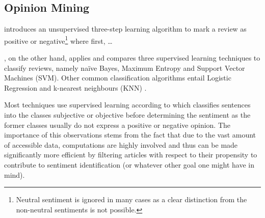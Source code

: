 
\subsection{Opinion Mining}

\textcite{Turney.2002} introduces an unsupervised three-step learning algorithm to mark a review as positive or negative\footnote{Neutral sentiment is ignored in many cases as a clear distinction from the non-neutral sentiments is not possible.} where first, \dots


\textcite{Pang.2002}, on the other hand, applies and compares three supervised learning techniques to classify reviews, namely na\"{i}ve Bayes, Maximum Entropy and Support Vector Machines (SVM). Other common classification algorithms entail Logistic Regression and k-nearest neighbours (KNN) \parencite{Feldman.2013}.


Most techniques use supervised learning according to \textcite{Wiebe.1999} which classifies sentences into the classes subjective or objective before determining the sentiment as the former classes usually do not express a positive or negative opinion. The importance of this observations stems from the fact that due to the vast amount of accessible data, computations are highly involved and thus can be made significantly more efficient by filtering articles with respect to their propensity to contribute to sentiment identification (or whatever other goal one might have in mind). 


